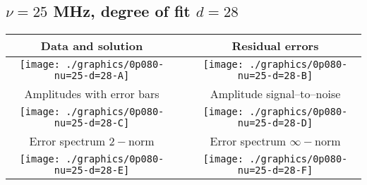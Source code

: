 

% 

\clearpage{}
\break{}

\subsection{$\nu = 25$ MHz, degree of fit $d = 28$}

\begin{table}[h]
    \begin{center}
        \begin{tabular}{ccc}
            Data and solution & \quad & Residual errors \\\hline
            \texttt{[image: ./graphics/0p080-nu=25-d=28-A]} &&
            \texttt{[image: ./graphics/0p080-nu=25-d=28-B]} \\[15pt]
            Amplitudes with error bars && Amplitude signal--to--noise \\\hline
            \texttt{[image: ./graphics/0p080-nu=25-d=28-C]} &&
            \texttt{[image: ./graphics/0p080-nu=25-d=28-D]} \\[15pt]
            Error spectrum $2-$norm && Error spectrum $\infty-$norm \\\hline
            \texttt{[image: ./graphics/0p080-nu=25-d=28-E]} &&
            \texttt{[image: ./graphics/0p080-nu=25-d=28-F]} \\[15pt]
        \end{tabular}
    \end{center}
\label{fig:elev=80, nu=25}
\end{table}



\endinput
